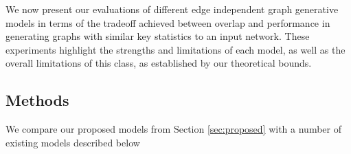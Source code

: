 
We now present our evaluations of different edge independent graph generative models in terms of the tradeoff achieved between overlap and performance in generating graphs with similar key statistics to an input network. %
These experiments highlight the strengths and limitations of each model, as well as the overall limitations of this class, as established by our theoretical bounds.


\subsection{Methods}
We compare our proposed models from Section \ref{sec:proposed} with a number of existing models described below %
